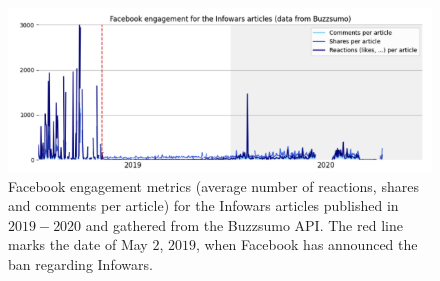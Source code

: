 \documentclass{article}
\begin{document}
\begin{figure}
	\centering
	
	\begin{multicols}{1}
		\includegraphics[scale=0.35]{./img/infowars/fb_infowars_3.png}
	\end{multicols}

	\caption{Facebook engagement metrics (average number of reactions, shares and comments per article) for the Infowars articles published in $2019-2020$ and gathered from the Buzzsumo API. The red line marks the date of May $2$, $2019$, when Facebook has announced the ban regarding Infowars.}
	\label{infowars2}
\end{figure}
\end{document}
